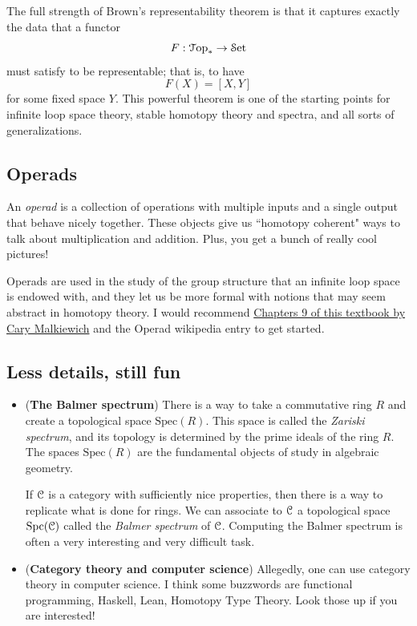 \documentclass[10pt]{amsart}
\newcommand{\euscr}[1]{\EuScript{#1}}
\theoremstyle{definition}
\newcommand{\cdef}[1]{\textcolor{Bittersweet}{#1}}
\begin{document}
The full strength of Brown's representability theorem is that it captures exactly the data that a functor
\[
F:\euscr{T}\mathrm{op}_* \to \euscr{S}\text{et}
\]
must satisfy to be representable; that is, to have
\[F(X) = [X, Y]\]
for some fixed space $Y$. This powerful theorem is one of the starting points for infinite loop space theory, stable homotopy theory and spectra, and all sorts of generalizations.

\subsection*{Operads}
An \cdef{\emph{operad}} is a collection of operations with multiple inputs and a single output that behave nicely together. These objects give us ``homotopy coherent" ways to talk about multiplication and addition. Plus, you get a bunch of really cool pictures! 

Operads are used in the study of the group structure that an infinite loop space is endowed with, and they let us be more formal with notions that may seem abstract in homotopy theory. I would recommend  \href{https://people.math.binghamton.edu/malkiewich/spectra_book_draft.pdf}{Chapters 9 of this textbook by Cary Malkiewich} and the Operad wikipedia entry to get started.


\subsection*{Less details, still fun}
\begin{itemize}
    \item (\textbf{The Balmer spectrum}) There is a way to take a commutative ring $R$ and create a topological space $\text{Spec}(R)$.
    This space is called the \emph{Zariski spectrum}, and its topology is determined by the prime ideals of the ring $R$.
    The spaces $\text{Spec}(R)$ are the fundamental objects of study in algebraic geometry.

    If $\euscr{C}$ is a category with sufficiently nice properties, then there is a way to replicate what is done for rings.
    We can associate to $\euscr{C}$ a topological space $\text{Spc}(\euscr{C})$ called the \cdef{\emph{Balmer spectrum}} of $\euscr{C}$.
    Computing the Balmer spectrum is often a very interesting and very difficult task.

    \item (\textbf{Category theory and computer science}) Allegedly, one can use category theory in computer science.
    I think some buzzwords are functional programming, Haskell, Lean, Homotopy Type Theory. Look those up if you are interested!
\end{itemize}
\end{document}
